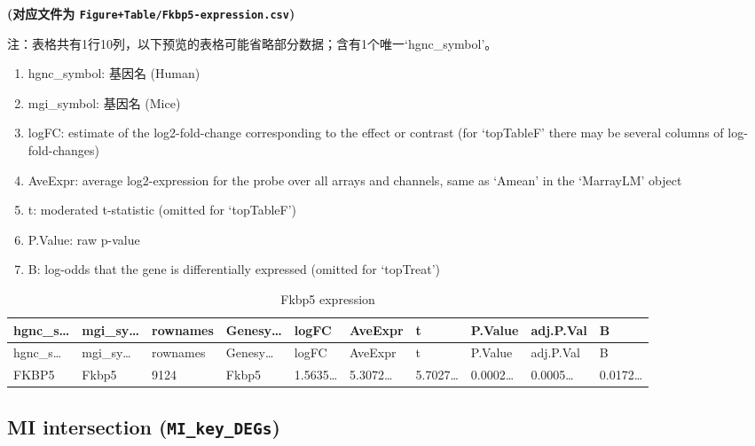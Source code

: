 \documentclass[
]{article}
\providecommand{\tightlist}{%
  \setlength{\itemsep}{0pt}\setlength{\parskip}{0pt}}
\begin{document}
\textbf{(对应文件为 \texttt{Figure+Table/Fkbp5-expression.csv})}

\begin{center}\begin{tcolorbox}[colback=gray!10, colframe=gray!50, width=0.9\linewidth, arc=1mm, boxrule=0.5pt]注：表格共有1行10列，以下预览的表格可能省略部分数据；含有1个唯一`hgnc\_symbol'。
\end{tcolorbox}
\end{center}
\begin{center}\begin{tcolorbox}[colback=gray!10, colframe=gray!50, width=0.9\linewidth, arc=1mm, boxrule=0.5pt]\begin{enumerate}\tightlist
\item hgnc\_symbol:  基因名 (Human)
\item mgi\_symbol:  基因名 (Mice)
\item logFC:  estimate of the log2-fold-change corresponding to the effect or contrast (for ‘topTableF’ there may be several columns of log-fold-changes)
\item AveExpr:  average log2-expression for the probe over all arrays and channels, same as ‘Amean’ in the ‘MarrayLM’ object
\item t:  moderated t-statistic (omitted for ‘topTableF’)
\item P.Value:  raw p-value
\item B:  log-odds that the gene is differentially expressed (omitted for ‘topTreat’)
\end{enumerate}\end{tcolorbox}
\end{center}

\begin{longtable}[]{@{}llllllllll@{}}
\caption{\label{tab:Fkbp5-expression}Fkbp5 expression}\tabularnewline
\toprule
hgnc\_s\ldots{} & mgi\_sy\ldots{} & rownames & Genesy\ldots{} & logFC & AveExpr & t & P.Value & adj.P.Val & B\tabularnewline
\midrule
\endfirsthead
\toprule
hgnc\_s\ldots{} & mgi\_sy\ldots{} & rownames & Genesy\ldots{} & logFC & AveExpr & t & P.Value & adj.P.Val & B\tabularnewline
\midrule
\endhead
FKBP5 & Fkbp5 & 9124 & Fkbp5 & 1.5635\ldots{} & 5.3072\ldots{} & 5.7027\ldots{} & 0.0002\ldots{} & 0.0005\ldots{} & 0.0172\ldots{}\tabularnewline
\bottomrule
\end{longtable}

\hypertarget{mi-intersection-mi_key_degs}{%
\subsection{\texorpdfstring{MI intersection (\texttt{MI\_key\_DEGs})}{MI intersection (MI\_key\_DEGs)}}\label{mi-intersection-mi_key_degs}}
\end{document}
